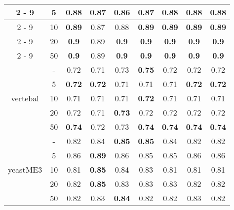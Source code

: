 \documentclass{article}%
\begin{document}
\begin{tabular}{c|c|ccccccc}
\cline{2%
-%
9}%
&5&\textbf{0.88}&0.87&0.86&0.87&\textbf{0.88}&\textbf{0.88}&\textbf{0.88}\\%
\cline{2%
-%
9}%
&10&\textbf{0.89}&0.87&0.88&\textbf{0.89}&\textbf{0.89}&\textbf{0.89}&\textbf{0.89}\\%
\cline{2%
-%
9}%
&20&\textbf{0.9}&0.89&\textbf{0.9}&\textbf{0.9}&\textbf{0.9}&\textbf{0.9}&\textbf{0.9}\\%
\cline{2%
-%
9}%
&50&\textbf{0.9}&0.89&\textbf{0.9}&\textbf{0.9}&\textbf{0.9}&\textbf{0.9}&\textbf{0.9}\\%
\hline%
\multirow{5}{*}{vertebal}&{-}&0.72&0.71&0.73&\textbf{0.75}&0.72&0.72&0.72\\%
\cline{2%
-%
9}%
&5&\textbf{0.72}&\textbf{0.72}&0.71&0.71&0.71&\textbf{0.72}&\textbf{0.72}\\%
\cline{2%
-%
9}%
&10&0.71&0.71&0.71&\textbf{0.72}&0.71&0.71&0.71\\%
\cline{2%
-%
9}%
&20&0.72&0.71&\textbf{0.73}&0.72&0.72&0.72&0.72\\%
\cline{2%
-%
9}%
&50&\textbf{0.74}&0.72&0.73&\textbf{0.74}&\textbf{0.74}&\textbf{0.74}&\textbf{0.74}\\%
\hline%
\multirow{5}{*}{yeastME3}&{-}&0.82&0.84&\textbf{0.85}&\textbf{0.85}&0.84&0.82&0.82\\%
\cline{2%
-%
9}%
&5&0.86&\textbf{0.89}&0.86&0.85&0.85&0.86&0.86\\%
\cline{2%
-%
9}%
&10&0.81&\textbf{0.85}&0.84&0.83&0.81&0.81&0.81\\%
\cline{2%
-%
9}%
&20&0.82&\textbf{0.85}&0.83&0.83&0.83&0.82&0.82\\%
\cline{2%
-%
9}%
&50&0.82&0.83&\textbf{0.84}&0.82&0.82&0.83&0.82\\%
\hline%
\end{tabular}

%
\end{document}
